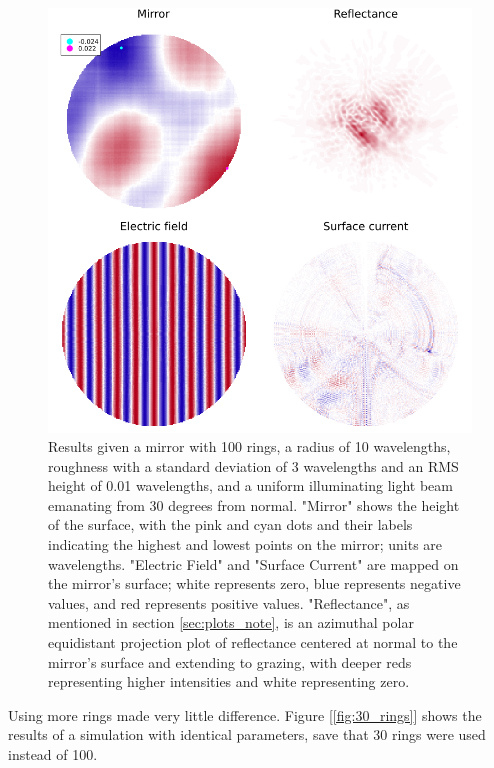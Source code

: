 \documentclass[etd,senior,noacknowledgments]{BYUPhys}
\begin{document}
\begin{figure}
  \centerline{\includegraphics[width=\textwidth]{100-ring-results}}
  \caption[Results with 100 rings]{\label{fig:100_rings}
    Results given a mirror with 100 rings, a radius of 10 wavelengths, roughness with a standard deviation of 3 wavelengths and an RMS height of 0.01 wavelengths, and a uniform illuminating light beam emanating from 30 degrees from normal. "Mirror" shows the height of the surface, with the pink and cyan dots and their labels indicating the highest and lowest points on the mirror; units are wavelengths. "Electric Field" and "Surface Current" are mapped on the mirror's surface; white represents zero, blue represents negative values, and red represents positive values. "Reflectance", as mentioned in section \ref{sec:plots_note}, is an azimuthal polar equidistant projection plot of reflectance centered at normal to the mirror's surface and extending to grazing, with deeper reds representing higher intensities and white representing zero.}
\end{figure}

Using more rings made very little difference. Figure [\ref{fig:30_rings}] shows the results of a simulation with identical parameters, save that 30 rings were used instead of 100.
\end{document}
